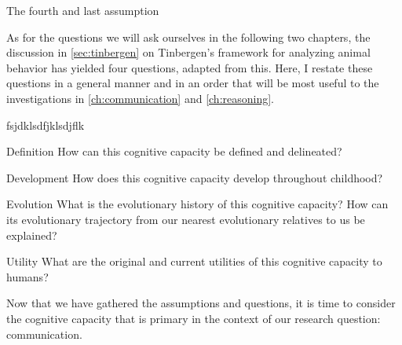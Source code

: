 The fourth and last assumption

As for the questions we will ask ourselves in the following two chapters, the discussion in \cref{sec:tinbergen} on Tinbergen's framework for analyzing animal behavior has yielded four questions, adapted from this. Here, I restate these questions in a general manner and in an order that will be most useful to the investigations in \cref{ch:communication} and \cref{ch:reasoning}.

\begin{labeling}{fsjdklsdfjklsdjflk}
    \item [Definition] How can this cognitive capacity be defined and delineated?
    \item [Development] How does this cognitive capacity develop throughout childhood?
    \item [Evolution] What is the evolutionary history of this cognitive capacity? How can its evolutionary trajectory from our nearest evolutionary relatives to us be explained?
    \item [Utility] What are the original and current utilities of this cognitive capacity to humans?
\end{labeling}

Now that we have gathered the assumptions and questions, it is time to consider the cognitive capacity that is primary in the context of our research question: communication.
